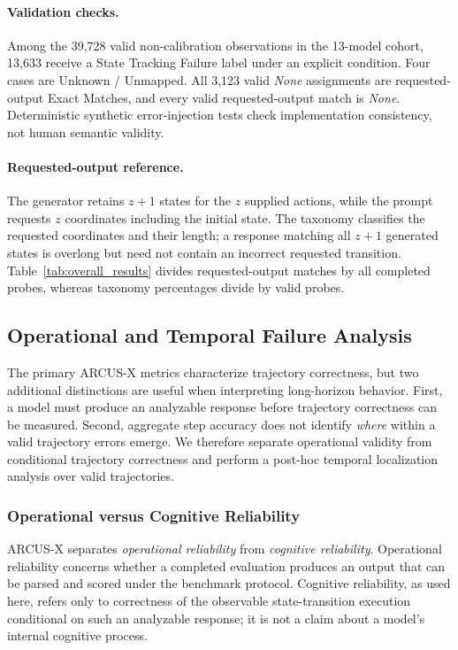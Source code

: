 \documentclass{article}
\begin{document}
\paragraph{Validation checks.}
Among the 39,728 valid non-calibration observations in the 13-model cohort,
13,633 receive a State Tracking Failure label under an explicit condition.
Four cases are Unknown / Unmapped. All 3,123 valid
\emph{None} assignments are requested-output Exact Matches, and every valid
requested-output match is \emph{None}. Deterministic synthetic error-injection
tests check implementation consistency, not human semantic validity.

\paragraph{Requested-output reference.}
The generator retains $z+1$ states for the $z$ supplied actions, while the
prompt requests $z$ coordinates including the initial state. The taxonomy
classifies the requested coordinates and their length; a response matching
all $z+1$ generated states is overlong but need not contain an incorrect
requested transition.
Table~\ref{tab:overall_results} divides requested-output matches by all
completed probes, whereas taxonomy percentages divide by valid probes.

\subsection{Operational and Temporal Failure Analysis}
\label{app:operational_temporal}

The primary ARCUS-X metrics characterize trajectory correctness, but two
additional distinctions are useful when interpreting long-horizon behavior.
First, a model must produce an analyzable response before trajectory
correctness can be measured. Second, aggregate step accuracy does not identify
\emph{where} within a valid trajectory errors emerge. We therefore separate
operational validity from conditional trajectory correctness and perform a
post-hoc temporal localization analysis over valid trajectories.

\subsubsection{Operational versus Cognitive Reliability}

ARCUS-X separates \emph{operational reliability} from \emph{cognitive
reliability}. Operational reliability concerns whether a completed evaluation
produces an output that can be parsed and scored under the benchmark protocol.
Cognitive reliability, as used here, refers only to correctness of the
observable state-transition execution conditional on such an analyzable
response; it is not a claim about a model's internal cognitive process.
\end{document}
